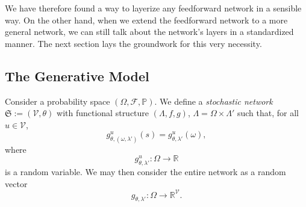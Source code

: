 \documentclass[a4paper,11pt]{report}
\begin{document}
\begin{Par}
We have therefore found a way to layerize any feedforward network in a sensible way. On the other hand, when we extend the feedforward network to a more general network, we can still talk about the network's layers in a standardized manner. The next section lays the groundwork for this very necessity.
\end{Par}

\subsection{The Generative Model}\label{subsec:theory-structure-predicode}

\begin{Def}
Consider a probability space $(\Omega,\mathcal{F},\mathbb{P})$. We define a \emph{stochastic network} $\mathfrak{S}:=(\mathcal{V},\theta)$ with functional structure $(\Lambda,f,g)$, $\Lambda=\Omega\times\Lambda'$ such that, for all $u\in\mathcal{V}$,
\begin{equation}
g^u_{\theta,(\omega,\lambda')}\left(s\right)=g^u_{\theta,\lambda'}(\omega),
\end{equation}
where
\[
g^u_{\theta,\lambda'}:\Omega\to\mathbb{R}
\]
is a random variable. We may then consider the entire network as a random vector
\[
g_{\theta,\lambda'}:\Omega\to\mathbb{R}^{\mathcal{V}}.
\]
\end{Def}
\end{document}
